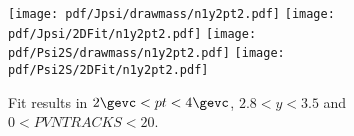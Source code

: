 \begin{figure}[H]
\begin{center}
\texttt{[image: pdf/Jpsi/drawmass/n1y2pt2.pdf]}
\texttt{[image: pdf/Jpsi/2DFit/n1y2pt2.pdf]}
\vspace*{-0.5cm}
\texttt{[image: pdf/Psi2S/drawmass/n1y2pt2.pdf]}
\texttt{[image: pdf/Psi2S/2DFit/n1y2pt2.pdf]}
\vspace*{-0.5cm}
\end{center}
\caption{Fit results in $2\gevc<pt<4\gevc$, $2.8<y<3.5$ and $0<PVNTRACKS<20$.}
\label{Fitn1y2pt2}
\end{figure}
